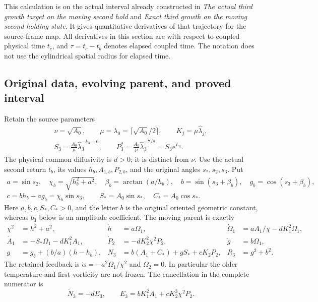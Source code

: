 \documentclass[11pt]{article}
\begin{document}
This calculation is on the actual interval already constructed in
\emph{The actual third growth target on the moving second hold} and
\emph{Exact third growth on the moving second holding state}. It gives
quantitative derivatives of that trajectory for the source-frame map.
All derivatives in this section are with respect to coupled physical
time $t_c$, and $\tau=t_c-t_b$ denotes elapsed coupled time. The notation
does not use the cylindrical spatial radius for elapsed time.

\subsection{Original data, evolving parent, and proved interval}

Retain the source parameters
\begin{equation}\label{tgdc:original}
\begin{gathered}
 \nu=\sqrt{A_0},\qquad
 \mu=\lambda_0=\lceil\sqrt{A_0}/2\rceil,\qquad
 K_j=\mu\widehat\lambda_j,\\
 S_3=\frac{A_0}{\mu}\widehat\lambda_3^{-k_3-6},\qquad
 P_3^*=\frac{A_0}{\mu}\widehat\lambda_3^{-7/8}=S_3e^{L_3}.
\end{gathered}
\end{equation}
The physical common diffusivity is $d>0$; it is distinct from $\nu$.
Use the actual second return $t_b$, its values $h_b,A_{1,b},P_{2,b}$,
and the original angles $s_*,s_2,s_3$. Put
\begin{equation}\label{tgdc:constants}
\begin{gathered}
 a=\sin s_2,\quad \chi_b=\sqrt{h_b^2+a^2},\quad
 \beta_b=\arctan(a/h_b),\quad
 b=\sin(s_3+\beta_b),\quad g_b=\cos(s_3+\beta_b),\\
 c=bh_b-ag_b=\chi_b\sin s_3,\qquad
 S_*=A_0\sin s_*,\quad C_*=A_0\cos s_*.
\end{gathered}
\end{equation}
Here $a,b,c,S_*,C_*>0$, and the letter $b$ is the original oriented
geometric constant, whereas $b_3$ below is an amplitude coefficient.
The moving parent is exactly
\begin{equation}\label{tgdc:parent}
\begin{aligned}
 \chi^2&=h^2+a^2,& \dot h&=a\Omega_1,&
 \dot\Omega_1&=aA_1/\chi-dK_1^2\Omega_1,\\
 \dot A_1&=-S_*\Omega_1-dK_1^2A_1,&
 \dot P_2&=-dK_2^2\chi^2P_2,&
 \dot g&=b\Omega_1,\\
 g&=g_b+(b/a)(h-h_b),&
 N_3&=b(A_1+C_*)+gS_*+cK_2P_2,&
 R_3&=g^2+b^2.
\end{aligned}
\end{equation}
The retained feedback is $\dot\alpha=-a^2\Omega_1/\chi^2$ and
$\Omega_2=0$. In particular the older temperature and first vorticity
are not frozen. The cancellation in the complete numerator is
\begin{equation}\label{tgdc:numerator}
 \dot N_3=-dE_3,\qquad
 E_3=bK_1^2A_1+cK_2^3\chi^2P_2.
\end{equation}
\end{document}
